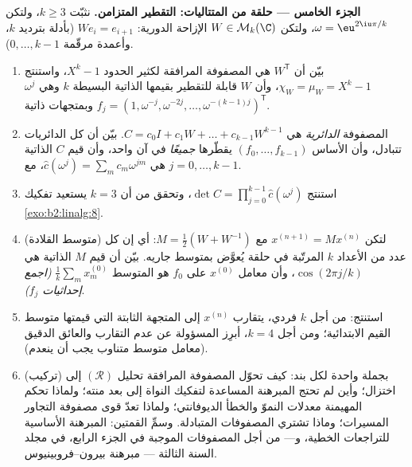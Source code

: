 \begin{problem}
\medskip
\noindent\textbf{الجزء الخامس --- حلقة من المتتاليات: التقطير
المتزامن.} نثبّت $k \geq 3$، ولتكن $\omega = \eu^{2\iu\pi/k}$،
ولتكن $W \in \mathcal{M}_k(\C)$ الإزاحة الدورية: $W e_i =
e_{i+1}$ (بأدلة بترديد $k$، وأعمدة مرقّمة $0, \dots, k-1$).
\begin{enumerate}[resume]
  \item بيّن أن $W^{\mathsf T}$ هي المصفوفة المرافقة لكثير الحدود
        $X^k - 1$، واستنتج $\chi_W = \mu_W = X^k - 1$، وأن $W$
        قابلة للتقطير بقيمها الذاتية البسيطة $k$
        وهي $\omega^j$ وبمتجهات ذاتية $f_j = (1, \omega^{-j},
        \omega^{-2j}, \dots, \omega^{-(k-1)j})^{\mathsf T}$.
  \item المصفوفة \emph{الدائرية} هي $C = c_0 I + c_1 W + \dots
        + c_{k-1}W^{k-1}$. بيّن أن كل الدائريات تتبادل،
        وأن الأساس $(f_0, \dots, f_{k-1})$ يقطّرها
        \emph{جميعًا} في آن واحد، وأن
        قيم $C$ الذاتية هي $\widehat c(\omega^j) = \sum_m
        c_m \omega^{jm}$، مع $j = 0, \dots, k-1$.
  \item استنتج $\det C = \prod_{j=0}^{k-1} \widehat
        c(\omega^j)$، وتحقق من أن $k = 3$ يستعيد
        تفكيك \cref{exo:b2:linalg:8}.
  \item (متوسط القلادة) لتكن $x^{(n+1)} = Mx^{(n)}$ مع
        $M = \frac12(W + W^{-1})$: أي إن كل عدد من الأعداد $k$ المرتّبة
        في حلقة يُعوَّض بمتوسط جاريه. بيّن أن قيم
        $M$ الذاتية هي $\cos(2\pi j/k)$، وأن معامل $x^{(0)}$
        على $f_0$ هو المتوسط $\frac1k\sum_m x^{(0)}_m$
        \emph{(اجمع إحداثيات $f_j$)}.
  \item استنتج: من أجل $k$ فردي، يتقارب $x^{(n)}$ إلى
        المتجهة الثابتة التي قيمتها متوسط القيم
        الابتدائية؛ ومن أجل $k = 4$، أبرِز  المسؤولة
        عن عدم التقارب والعائق الدقيق
        (معامل متوسط متناوب يجب أن ينعدم).
  \item (تركيب) بجملة واحدة لكل بند: كيف تحوّل المصفوفة
        المرافقة تحليل $(\mathcal R)$ إلى
        اختزال؛ وأين لم تحتج المبرهنة المساعدة لتفكيك النواة
        إلى بعد منته؛ ولماذا تحكم  المهيمنة
        معدلات النموّ والخطأ الديوفانتي؛ ولماذا تعدّ قوى
        مصفوفة التجاور المسيرات؛ وماذا تشتري المصفوفات
        المتبادلة. وسمِّ القمتين: المبرهنة الأساسية
        للتراجعات الخطية، و--- من أجل المصفوفات الموجبة
        في الجزء الرابع، في مجلد السنة الثالثة ---
        مبرهنة بيرون--فروبينيوس.
\end{enumerate}
\end{problem}
